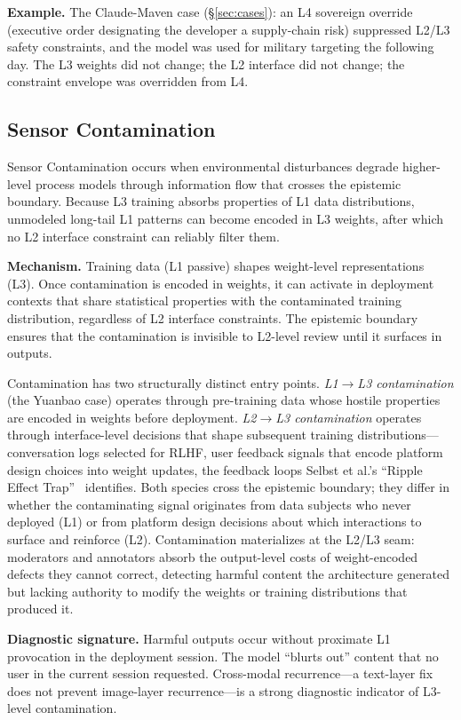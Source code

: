 \documentclass[11pt]{article}
\begin{document}
\textbf{Example.} The Claude-Maven case (\S\ref{sec:cases}): an L4 sovereign override (executive order designating the developer a supply-chain risk) suppressed L2/L3 safety constraints, and the model was used for military targeting the following day. The L3 weights did not change; the L2 interface did not change; the constraint envelope was overridden from L4.

\subsection{Sensor Contamination}

Sensor Contamination occurs when environmental disturbances degrade higher-level process models through information flow that crosses the epistemic boundary. Because L3 training absorbs properties of L1 data distributions, unmodeled long-tail L1 patterns can become encoded in L3 weights, after which no L2 interface constraint can reliably filter them.

\textbf{Mechanism.} Training data (L1 passive) shapes weight-level representations (L3). Once contamination is encoded in weights, it can activate in deployment contexts that share statistical properties with the contaminated training distribution, regardless of L2 interface constraints. The epistemic boundary ensures that the contamination is invisible to L2-level review until it surfaces in outputs.

Contamination has two structurally distinct entry points. \textit{L1$\to$L3 contamination} (the Yuanbao case) operates through pre-training data whose hostile properties are encoded in weights before deployment. \textit{L2$\to$L3 contamination} operates through interface-level decisions that shape subsequent training distributions---conversation logs selected for RLHF, user feedback signals that encode platform design choices into weight updates, the feedback loops Selbst et al.'s ``Ripple Effect Trap''~\cite{selbst2019fairness} identifies. Both species cross the epistemic boundary; they differ in whether the contaminating signal originates from data subjects who never deployed (L1) or from platform design decisions about which interactions to surface and reinforce (L2). Contamination materializes at the L2/L3 seam: moderators and annotators absorb the output-level costs of weight-encoded defects they cannot correct, detecting harmful content the architecture generated but lacking authority to modify the weights or training distributions that produced it.

\textbf{Diagnostic signature.} Harmful outputs occur without proximate L1 provocation in the deployment session. The model ``blurts out'' content that no user in the current session requested. Cross-modal recurrence---a text-layer fix does not prevent image-layer recurrence---is a strong diagnostic indicator of L3-level contamination.
\end{document}
